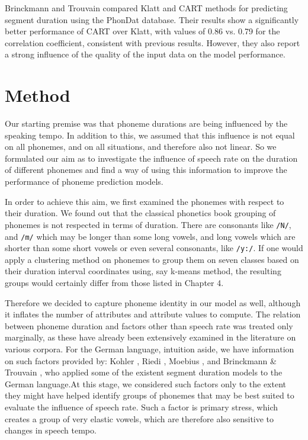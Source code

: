 \documentclass[11pt,a4paper]{scrbook}
\begin{document}
Brinckmann and Trouvain \cite{Brinckmann_2003} compared Klatt and CART methods for predicting segment duration using the PhonDat database. Their results show a significantly better performance of CART over Klatt, with values of 0.86 vs. 0.79 for the correlation coefficient, consistent with previous results. However, they also report a strong influence of  the quality of the input data on the model performance.

\section{Method}
Our starting premise was that phoneme durations are being influenced by the speaking tempo. In addition to this, we assumed that this influence is not equal on all phonemes, and on all situations, and therefore also not linear. So we formulated our aim as to investigate the influence of speech rate on the duration of different phonemes and find a way of using this information to improve the performance of phoneme prediction models. 

In order to achieve this aim, we first examined the phonemes with respect to their duration. We found out that the classical phonetics book grouping of phonemes is not respected in terms of duration. There are consonants like \texttt{/N/}, and \texttt{/m/} which may be longer than some long vowels, and long vowels which are shorter than some short vowels or even several consonants, like \texttt{/y:/}. If one would apply a clustering method on phonemes to group them on seven classes based on their duration interval coordinates using, say k-means method, the resulting groups would certainly differ from those listed in Chapter 4.  

Therefore we decided to capture phoneme identity in our model as well, although it inflates the number of attributes and attribute values to compute. The relation between phoneme duration and factors other than speech rate was treated only marginally, as these have already been extensively examined in the literature on various corpora. For the German language, intuition aside, we have information on such factors provided by: Kohler \cite{Kohler1992}, Riedi \cite{Riedi1995}, Moebius \cite{Moebius1996}, and Brinckmann \& Trouvain \cite{Brinckmann_2003}, who applied some of the existent segment duration models to the German language.At this stage, we considered such factors only to the extent they might have helped identify groups of phonemes that may be best suited to evaluate the influence of speech rate. Such a factor is primary stress, which creates a group of very elastic vowels, which are therefore also sensitive to changes in speech tempo.
\end{document}
